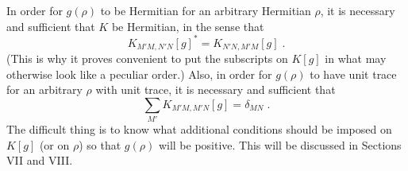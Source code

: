 \documentclass[12pt]{article}
\begin{document}
In order for $g(\rho)$ to be Hermitian for an arbitrary Hermitian $\rho$, it is necessary and sufficient that $K$ be Hermitian, in the sense that
 \begin{equation}
K_{M'M,N'N}[g]^*=K_{N'N,M'M}[g]\;.
\end{equation}
(This is why it proves convenient to put the subscripts on $K[g]$ in what may otherwise look like a peculiar order.)
Also, in order for $g(\rho)$ to have unit trace for an arbitrary $\rho$ with unit trace, it is necessary and sufficient that
 \begin{equation}
\sum_{M'}K_{M'M,M'N}[g]=\delta_{MN}\;.
\end{equation}
The difficult thing is to know  what additional conditions should be imposed on $K[g]$ (or on $\rho$) so that  $g(\rho)$ will be positive.  This will be discussed in Sections VII and VIII.  
\end{document}
